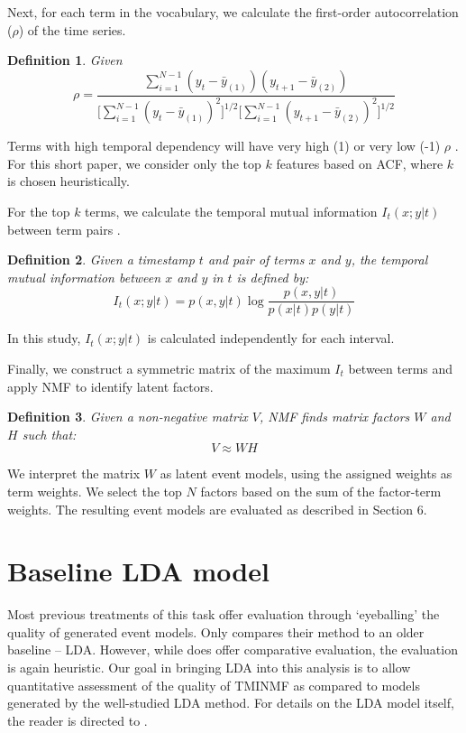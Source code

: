 \documentclass{sig-alternate}
\newtheorem{definition}{Definition}
\begin{document}
Next, for each term in the vocabulary, we calculate the first-order autocorrelation ($\rho$) of the time series. 
\begin{definition}
 Given 
\[
\rho = \dfrac{\sum_{i=1}^{N-1} (y_t - \bar{y}_{(1)})(y_{t+1} - \bar{y}_{(2)})}{ \big [ \sum_{i=1}^{N-1}  (y_t - \bar{y}_{(1)})^2 \big ] ^{1/2} \big [\sum_{i=1}^{N-1} (y_{t+1} - \bar{y}_{(2)})^2 \big ]^{1/2}}
\]
\end{definition}

Terms with high temporal dependency will have very high (1) or very low (-1) $\rho$  \cite{Jones2007}.  For this short paper, we consider only the top $k$ features based on ACF, where $k$ is chosen heuristically.

For the top $k$ terms, we calculate the temporal mutual information $I_t(x;y \vert t)$ between term pairs \cite{Teng2008}. 

\begin{definition}
Given a timestamp $t$ and pair of terms $x$ and $y$, the temporal mutual information between $x$ and $y$ in $t$ is defined by:
\[
I_t(x;y \vert t) = p(x,y \vert t) \log \dfrac{p(x,y \vert t)}{p(x \vert t) p(y \vert t)}
\]
\end{definition}

In this study, $I_t(x;y \vert t)$ is calculated independently for each interval.

Finally, we construct a symmetric matrix of the maximum $I_t$ between terms and apply NMF \cite{Lee2001} to identify latent factors. 
\begin{definition}
 Given a non-negative matrix $V$, NMF finds matrix factors $W$ and $H$ such that:
\[
V \approx WH
\]
\end{definition}

We interpret the matrix $W$ as latent event models, using the assigned weights as term weights. We select the top $N$ factors based on the sum of the factor-term weights. The resulting event models are evaluated as described in Section 6.

\section{Baseline LDA model}

Most previous treatments of this task offer evaluation through `eyeballing' the quality of generated event models. Only \cite{Weng2011} compares their  method to an older baseline -- LDA.  However, while \cite{Weng2011} does offer comparative evaluation, the evaluation is again heuristic. Our goal in bringing LDA into this analysis is to allow quantitative assessment of the quality of TMINMF as compared to models generated by the well-studied LDA method. For details on the LDA model itself, the reader is directed to \cite{Blei2003}.
\end{document}
